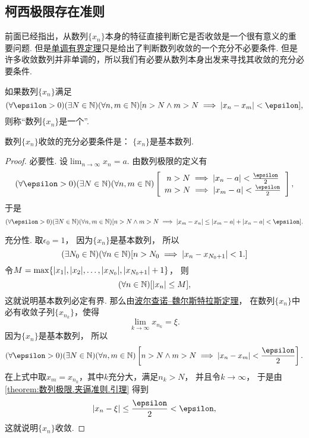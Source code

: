 \subsection{柯西极限存在准则}
前面已经指出，从数列\(\{x_n\}\)本身的特征直接判断它是否收敛是一个很有意义的重要问题.
但是\hyperref[theorem:极限.数列的单调有界定理]{单调有界定理}只是给出了判断数列收敛的一个充分不必要条件.
但是许多收敛数列并非单调的，所以我们有必要从数列本身出发来寻找其收敛的充分必要条件.

\begin{definition}
如果数列\(\{x_n\}\)满足\[
	(\forall\epsilon>0)
	(\exists N\in\mathbb{N})
	(\forall n,m\in\mathbb{N})
	[n > N \land m > N \implies \abs{x_n - x_m} < \epsilon],
\]
则称“数列\(\{x_n\}\)是一个”.
\end{definition}

\begin{theorem}[柯西极限存在准则]\label{theorem:极限.数列的柯西极限存在准则}
数列\(\{x_n\}\)收敛的充分必要条件是：
\(\{x_n\}\)是基本数列.
\begin{proof}
必要性.
设\(\lim_{n\to\infty} x_n = a\).
由数列极限的定义有\[
	(\forall\epsilon>0)
	(\exists N\in\mathbb{N})
	(\forall n,m\in\mathbb{N})
	\left[\def\arraystretch{1.2}
		\begin{array}{c}
			n > N \implies \abs{x_n - a} < \frac\epsilon2 \\
			m > N \implies \abs{x_m - a} < \frac\epsilon2
		\end{array}
	\right],
\]
于是\[
	(\forall\epsilon>0)
	(\exists N\in\mathbb{N})
	(\forall n,m\in\mathbb{N})
	[
		n > N \land m > N
		\implies
		\abs{x_m - x_n}
		\leq \abs{x_m - a} + \abs{x_n - a}
		< \epsilon
	].
\]

充分性.
取\(\epsilon_0 = 1\)，
因为\(\{x_n\}\)是基本数列，
所以\[
	(\exists N_0\in\mathbb{N})
	(\forall n\in\mathbb{N})
	[
		n > N_0
		\implies
		\abs{x_n - x_{N_0+1}} < 1.
	]
\]
令\(M = \max\{\abs{x_1},\abs{x_2},\dotsc,\abs{x_{N_0}},\abs{x_{N_0+1}}+1\}\)，
则\[
	(\forall n\in\mathbb{N})
	[\abs{x_n} \leq M],
\]
这就说明基本数列必定有界.
那么由\hyperref[theorem:极限.波尔查诺--魏尔斯特拉斯定理]{波尔查诺--魏尔斯特拉斯定理}，
在数列\(\{x_n\}\)中必有收敛子列\(\{x_{n_k}\}\)，使得\[
	\lim_{k\to\infty} x_{n_k} = \xi.
\]
因为\(\{x_n\}\)是基本数列，
所以\[
	(\forall\epsilon>0)
	(\exists N\in\mathbb{N})
	(\forall n,m\in\mathbb{N})
	\left[
		n > N \land m > N
		\implies
		\abs{x_n - x_m} < \frac\epsilon2
	\right].
\]
在上式中取\(x_m = x_{n_k}\)，其中\(k\)充分大，满足\(n_k > N\)，
并且令\(k\to\infty\)，
于是由\cref{theorem:数列极限.夹逼准则.引理} 得到\[
	\abs{x_n - \xi}
	\leq \frac\epsilon2
	< \epsilon,
\]
这就说明\(\{x_n\}\)收敛.
\end{proof}
\end{theorem}

